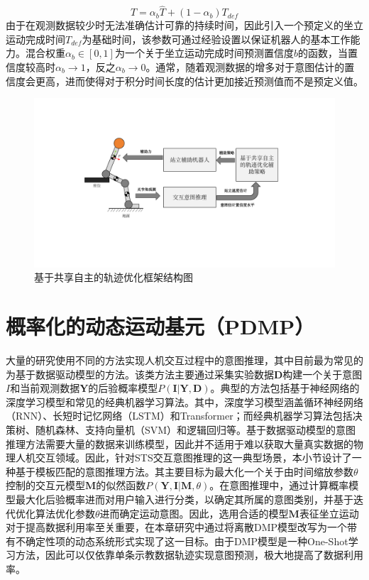\begin{equation}
    T=\alpha_b \hat T + (1-\alpha_b)T_{def}
    \label{eq:4-6}
\end{equation}
由于在观测数据较少时无法准确估计可靠的持续时间，因此引入一个预定义的坐立运动完成时间$T_{def}$为基础时间，该参数可通过经验设置以保证机器人的基本工作能力。混合权重$\alpha_b \in [0,1]$为一个关于坐立运动完成时间预测置信度$b$的函数，当置信度较高时$\alpha_b \rightarrow 1$，反之$\alpha_b \rightarrow 0$。通常，随着观测数据的增多对于意图估计的置信度会更高，进而使得对于积分时间长度的估计更加接近预测值而不是预定义值。

\begin{figure}[htb]
    \centering\includegraphics[width=1\textwidth]{figures/4-Fig-2.pdf}
    \caption{基于共享自主的轨迹优化框架结构图}
    \label{fig:4-2}
\end{figure}

\section{概率化的动态运动基元（PDMP）} 
大量的研究使用不同的方法实现人机交互过程中的意图推理，其中目前最为常见的为基于数据驱动模型的方法。该类方法主要通过采集实验数据$\mathbf{D}$构建一个关于意图$I$和当前观测数据$\mathbf{Y}$的后验概率模型$P(\mathbf{I}|\mathbf{Y},\mathbf{D})$。典型的方法包括基于神经网络的深度学习模型和常见的经典机器学习算法。其中，深度学习模型涵盖循环神经网络（RNN）、长短时记忆网络（LSTM）和Transformer；而经典机器学习算法包括决策树、随机森林、支持向量机（SVM）和逻辑回归等。基于数据驱动模型的意图推理方法需要大量的数据来训练模型，因此并不适用于难以获取大量真实数据的物理人机交互领域。因此，针对STS交互意图推理的这一典型场景，本小节设计了一种基于模板匹配的意图推理方法。其主要目标为最大化一个关于由时间缩放参数$\theta$控制的交互元模型$\mathbf{M}$的似然函数$P(\mathbf{Y},\mathbf{I}|\mathbf{M},\theta)$。在意图推理中，通过计算概率模型最大化后验概率进而对用户输入进行分类，以确定其所属的意图类别，并基于迭代优化算法优化参数$\theta$进而确定运动意图。因此，选用合适的模型$\mathbf{M}$表征坐立运动对于提高数据利用率至关重要，在本章研究中通过将离散DMP模型改写为一个带有不确定性项的动态系统形式实现了这一目标。由于DMP模型是一种One-Shot学习方法，因此可以仅依靠单条示教数据轨迹实现意图预测，极大地提高了数据利用率。

